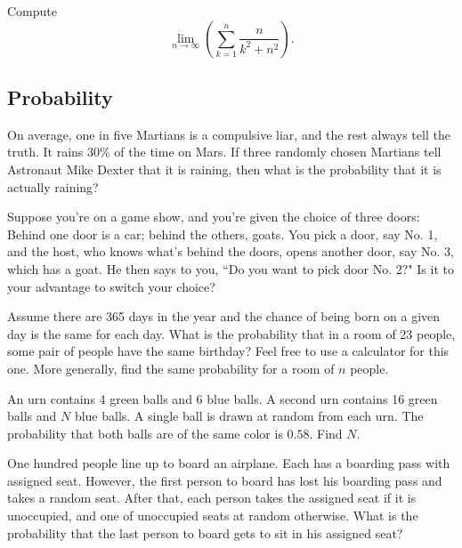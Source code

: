 \documentclass[12pt]{article}
\begin{document}
        \begin{exercise}
            Compute
            \[\lim_{n\to\infty}\left(\sum_{k=1}^n \frac{n}{k^2+n^2}\right).\]
        \end{exercise}

    \subsection{Probability}

    \begin{exercise}
        On average, one in five Martians is a compulsive liar, and the rest always tell the truth.
        It rains \(30\%\) of the time on Mars.
        If three randomly chosen Martians tell Astronaut Mike Dexter that it is raining, then what is the probability that it is actually raining?
    \end{exercise}

    \begin{exercise}
        Suppose you're on a game show, and you're given the choice of three doors: Behind one door is a car; behind the others, goats. 
        You pick a door, say No. 1, and the host, who knows what's behind the doors, opens another door, say No. 3, which has a goat. 
        He then says to you, ``Do you want to pick door No. 2?" Is it to your advantage to switch your choice?
    \end{exercise}

    \begin{exercise}
        Assume there are 365 days in the year and the chance of being born on a given day is the same for each day.
        What is the probability that in a room of 23 people, some pair of people have the same birthday?
        Feel free to use a calculator for this one.
        More generally, find the same probability for a room of \(n\) people.
    \end{exercise}

    \begin{exercise}
        An urn contains 4 green balls and 6 blue balls.
        A second urn contains 16 green balls and \(N\) blue balls.
        A single ball is drawn at random from each urn.
        The probability that both balls are of the same color is \(0.58\).
        Find \(N\).
    \end{exercise}

    \begin{exercise}
        One hundred people line up to board an airplane. 
        Each has a boarding pass with assigned seat. 
        However, the first person to board has lost his boarding pass and takes a random seat. 
        After that, each person takes the assigned seat if it is unoccupied, and one of unoccupied seats at random otherwise. 
        What is the probability that the last person to board gets to sit in his assigned seat?
    \end{exercise}
\end{document}
